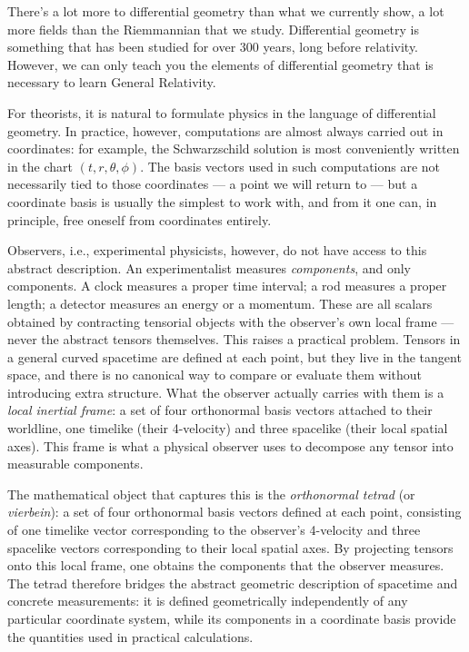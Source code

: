 		There's a lot more to differential geometry 
		than what we currently show, a lot more fields than
		the Riemmannian that we study. Differential geometry is something that has been studied for over
		300 years, long before relativity. However, we can only teach you 
		the elements of differential geometry that is necessary to learn General Relativity.

		For theorists, it is natural to formulate physics in the language of
		differential geometry. In practice, however, computations are almost
		always carried out in coordinates: for example, the Schwarzschild
		solution is most conveniently written in the chart $(t, r, \theta, \phi)$.
		The basis vectors used in such computations are not necessarily tied to
		those coordinates — a point we will return to — but a coordinate basis
		is usually the simplest to work with, and from it one can, in principle,
		free oneself from coordinates entirely.

		Observers, i.e., experimental physicists, however, do not have access to this abstract description.
		An experimentalist measures \emph{components}, and only components. A
		clock measures a proper time interval; a rod measures a proper length;
		a detector measures an energy or a momentum. These are all scalars
		obtained by contracting tensorial objects with the observer's own
		local frame — never the abstract tensors themselves.
		This raises a practical problem. Tensors in a general curved spacetime
		are defined at each point, but they live in the tangent space, and there
		is no canonical way to compare or evaluate them without introducing
		extra structure. What the observer actually carries with them is a
		\emph{local inertial frame}: a set of four orthonormal basis vectors
		attached to their worldline, one timelike (their 4-velocity) and three
		spacelike (their local spatial axes). This frame is what a physical
		observer uses to decompose any tensor into measurable components.

		The mathematical object that captures this is the \textit{orthonormal tetrad}
		(or \emph{vierbein}): a set of four orthonormal basis vectors defined at each
		point, consisting of one timelike vector corresponding to the observer's 4-velocity
		and three spacelike vectors corresponding to their local spatial axes. By projecting
		tensors onto this local frame, one obtains the components that the observer measures.
		The tetrad therefore bridges the abstract geometric description of spacetime and
		concrete measurements: it is defined geometrically independently of any particular
		coordinate system, while its components in a coordinate basis provide the quantities
		used in practical calculations.

